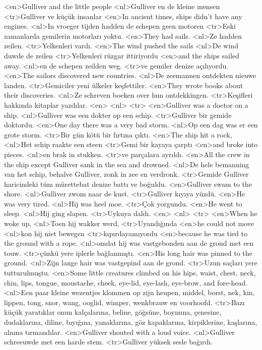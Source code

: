 <en>Gulliver and the little people  
<nl>Gulliver en de kleine mensen  
<tr>Gulliver ve küçük insanlar 
<en>In ancient times, ships didn’t have any engines.
<nl>In vroeger tijden hadden de schepen geen motoren
<tr>Eski zamanlarda gemilerin motorları yoktu.
<en>They had sails.
<nl>Ze hadden zeilen.
<tr>Yelkenleri vardı.
<en>The wind pushed the sails
<nl>De wind duwde de zeilen
<tr>Yelkenleri rüzgar ittiriyordu
<en>and the ships sailed away.
<nl>en de schepen zeilden weg.
<tr>ve gemiler denize açılıyordu.
<en>The sailors discovered new countries.
<nl>De zeemannen ontdekten nieuwe landen.
<tr>Gemiciler yeni ülkeler keşfettiler.
<en>They wrote books about their discoveries.
<nl>Ze schreven boeken over hun ontdekkingen.
<tr>Keşifleri hakkında kitaplar yazdılar.
<en>
<nl>
<tr>
<en>Gulliver was a doctor on a ship.
<nl>Gulliver was een dokter op een schip.
<tr>Gulliver bir gemide doktordu.
<en>One day there was a very bad storm.
<nl>Op een dag was er een grote storm.
<tr>Bir gün kötü bir fırtına çıktı.
<en>The ship hit a rock,
<nl>Het schip raakte een steen
<tr>Gemi bir kayaya çarptı
<en>and broke into pieces.
<nl>en brak in stukken.
<tr>ve parçalara ayrıldı.
<en>All the crew in the ship except Gulliver sank in the sea and drowned.
<nl>De hele bemanning van het schip, behalve Gulliver, zonk in zee en verdronk.
<tr>Gemide Gulliver haricindeki tüm mürettebat denize battı ve boğuldu.
<en>Gulliver swam to the shore.
<nl>Gulliver zwom naar de kust.
<tr>Gulliver kıyıya yüzdü.
<en>He was very tired.
<nl>Hij was heel moe.
<tr>Çok yorgundu.
<en>He went to sleep.
<nl>Hij ging slapen.
<tr>Uykuya daldı.
<en>
<nl>
<tr>
<en>When he woke up,
<nl>Toen hij wakker werd,
<tr>Uyandığında
<en>he could not move
<nl>kon hij niet bewegen
<tr>kıpırdayamıyordu
<en>because he was tied to the ground with a rope.
<nl>omdat hij was vastgebonden aan de grond met een touw.
<tr>çünkü yere iplerle bağlanmıştı.
<en>His long hair was pinned to the ground.
<nl>Zijn lange hair was vastgepind aan de grond.
<tr>Uzun saçları yere tutturulmuştu.
<en>Some little creatures climbed on his hips, waist, chest, neck, chin, lips, tongue, moustache, cheek, eye-lid, eye-lash, eye-brow, and fore-head.
<nl>Een paar kleine wezentjes klommen op zijn heupen, middel, borst, nek, kin, lippen, tong, snor, wang, ooglid, wimper, wenkbrauw en voorhoofd.
<tr>Bazı küçük yaratıklar onun kalçalarına, beline, göğsüne, boynuna, çenesine, dudaklarına, diline, bıyığına, yanaklarına, göz kapaklarına, kirpiklerine, kaşlarına, alnına tırmandılar.
<en>Gulliver shouted with a  loud voice.
<nl>Gulliver schreeuwde met  een  harde stem.
<tr>Gulliver yüksek  sesle bağırdı.

